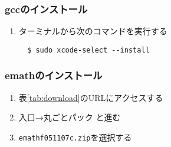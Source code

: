 \subsubsection{gccのインストール}
\begin{enumerate}
    \item ターミナルから次のコマンドを実行する
          \begin{lstlisting}
  $ sudo xcode-select --install
          \end{lstlisting}
\end{enumerate}

\subsubsection{emathのインストール}
\begin{enumerate}
    \item 表\ref{tab:download}のURLにアクセスする
    \item 入口→丸ごとパック と進む
    \item \verb|emathf051107c.zip|を選択する
\end{enumerate}
